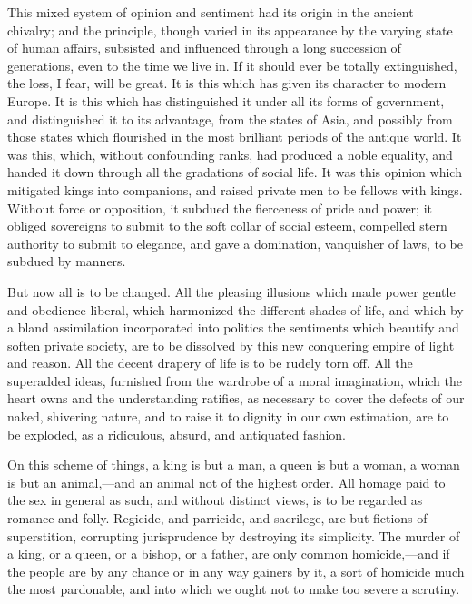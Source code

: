 This mixed system of opinion and sentiment had its origin in the ancient chivalry; and the principle, though varied in its appearance by the varying state of human affairs, subsisted and influenced through a long succession of generations, even to the time we live in. If it should ever be totally extinguished, the loss, I fear, will be great. It is this which has given its character to modern Europe. It is this which has distinguished it under all its forms of government, and distinguished it to its advantage, from the states of Asia, and possibly from those states which flourished in the most brilliant periods of the antique world. It was this, which, without confounding ranks, had produced a noble equality, and handed it down through all the gradations of social life. It was this opinion which mitigated kings into companions, and raised private men to be fellows with kings. Without force or opposition, it subdued the fierceness of pride and power; it obliged sovereigns to submit to the soft collar of social esteem, compelled stern authority to submit to elegance, and gave a domination, vanquisher of laws, to be subdued by manners.

But now all is to be changed. All the pleasing illusions which made power gentle and obedience liberal, which harmonized the different shades of life, and which by a bland assimilation incorporated into politics the sentiments which beautify and soften private society, are to be dissolved by this new conquering empire of light and reason. All the decent drapery of life is to be rudely torn off. All the superadded ideas, furnished from the wardrobe of a moral imagination, which the heart owns and the understanding ratifies, as necessary to cover the defects of our naked, shivering nature, and to raise it to dignity in our own estimation, are to be exploded, as a ridiculous, absurd, and antiquated fashion.

On this scheme of things, a king is but a man, a queen is but a woman, a woman is but an animal,—and an animal not of the highest order. All homage paid to the sex in general as such, and without distinct views, is to be regarded as romance and folly. Regicide, and parricide, and sacrilege, are but fictions of superstition, corrupting jurisprudence by destroying its simplicity. The murder of a king, or a queen, or a bishop, or a father, are only common homicide,—and if the people are by any chance or in any way gainers by it, a sort of homicide much the most pardonable, and into which we ought not to make too severe a scrutiny.

